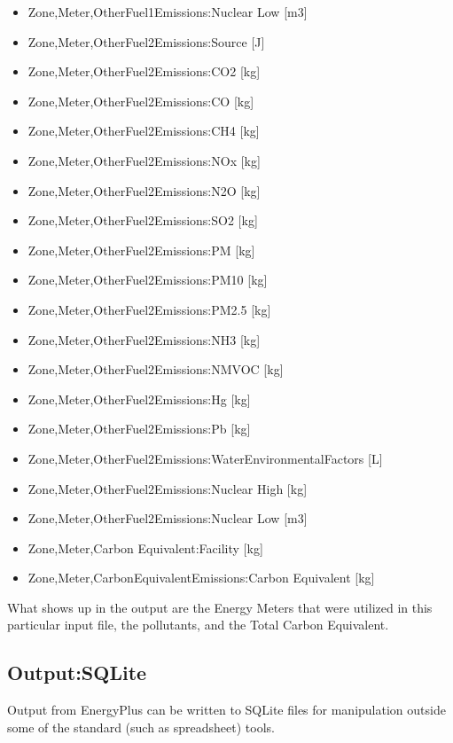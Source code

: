 \begin{itemize}
\item
  Zone,Meter,OtherFuel1Emissions:Nuclear Low {[}m3{]}
\item
  Zone,Meter,OtherFuel2Emissions:Source {[}J{]}
\item
  Zone,Meter,OtherFuel2Emissions:CO2 {[}kg{]}
\item
  Zone,Meter,OtherFuel2Emissions:CO {[}kg{]}
\item
  Zone,Meter,OtherFuel2Emissions:CH4 {[}kg{]}
\item
  Zone,Meter,OtherFuel2Emissions:NOx {[}kg{]}
\item
  Zone,Meter,OtherFuel2Emissions:N2O {[}kg{]}
\item
  Zone,Meter,OtherFuel2Emissions:SO2 {[}kg{]}
\item
  Zone,Meter,OtherFuel2Emissions:PM {[}kg{]}
\item
  Zone,Meter,OtherFuel2Emissions:PM10 {[}kg{]}
\item
  Zone,Meter,OtherFuel2Emissions:PM2.5 {[}kg{]}
\item
  Zone,Meter,OtherFuel2Emissions:NH3 {[}kg{]}
\item
  Zone,Meter,OtherFuel2Emissions:NMVOC {[}kg{]}
\item
  Zone,Meter,OtherFuel2Emissions:Hg {[}kg{]}
\item
  Zone,Meter,OtherFuel2Emissions:Pb {[}kg{]}
\item
  Zone,Meter,OtherFuel2Emissions:WaterEnvironmentalFactors {[}L{]}
\item
  Zone,Meter,OtherFuel2Emissions:Nuclear High {[}kg{]}
\item
  Zone,Meter,OtherFuel2Emissions:Nuclear Low {[}m3{]}
\item
  Zone,Meter,Carbon Equivalent:Facility {[}kg{]}
\item
  Zone,Meter,CarbonEquivalentEmissions:Carbon Equivalent {[}kg{]}
\end{itemize}

What shows up in the output are the Energy Meters that were utilized in this particular input file, the pollutants, and the Total Carbon Equivalent.

\subsection{Output:SQLite}\label{outputsqlite}

Output from EnergyPlus can be written to SQLite files for manipulation outside some of the standard (such as spreadsheet) tools.

